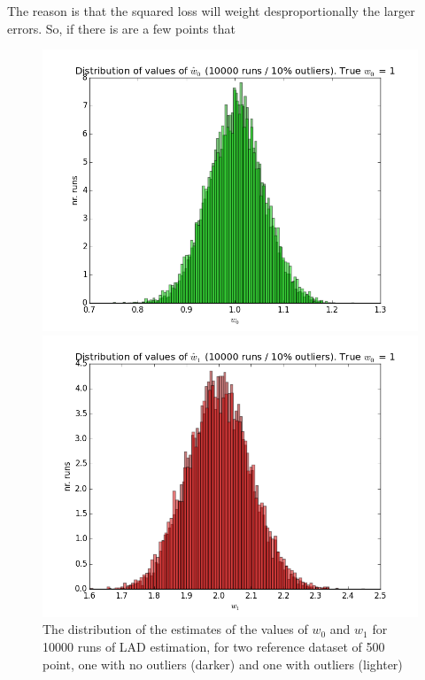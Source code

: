 The reason is that the squared loss will weight desproportionally the larger errors. So, if there is are a few points that 



\begin{figure}
\centering
\begin{minipage}{.5\textwidth}
  \centering
  \includegraphics[width=1.0\linewidth]{chapter_lad/lad_w0_with_and_without_outliers.png}
\end{minipage}%
\begin{minipage}{.5\textwidth}
  \centering
  \includegraphics[width=1.0\linewidth]{chapter_lad/lad_w1_with_and_without_outliers.png}
\end{minipage}
  \label{fig.ols_estimates_no_outliers}
  \caption{The distribution of the estimates of the values of $w_0$ and $w_1$ for 10000 runs of LAD estimation, for two reference dataset of 500 point, one with no outliers (darker) and one with outliers (lighter)}
\end{figure}

